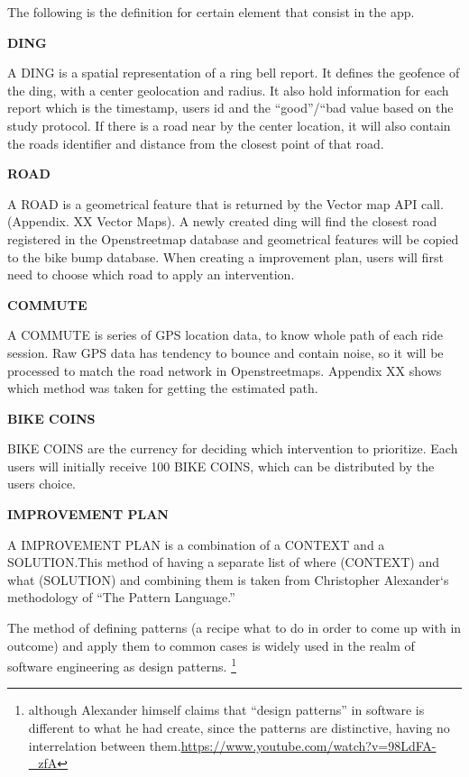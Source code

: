 The following is the definition for certain element that consist in the app.

\textbf{DING}

A DING is a spatial representation of a ring bell report. It defines the
geofence of the ding, with a center geolocation and radius. It also hold
information for each report which is the timestamp, users id and the
``good''/``bad value based on the study protocol. If there is a road near by the center location, it will also contain the roads identifier and distance from the closest point of that road.

\textbf{ROAD}

A ROAD is a geometrical feature that is returned by the Vector map API call. (Appendix. XX Vector Maps). A newly created ding will find the closest road registered in the Openstreetmap database and geometrical features will be copied to the bike bump database. When creating a improvement plan, users will first need to choose which road to apply an intervention.

\textbf{COMMUTE}

A COMMUTE is series of GPS location data, to know whole path of each ride session. Raw GPS data has tendency to bounce and contain noise, so it will be processed to match the road network in Openstreetmaps. Appendix XX shows which method was taken for getting the estimated path.

\textbf{BIKE COINS}

BIKE COINS are the currency for deciding which intervention to
prioritize. Each users will initially receive 100 BIKE COINS, which can be
distributed by the users choice.

\textbf{IMPROVEMENT PLAN}

A IMPROVEMENT PLAN is a combination of a CONTEXT and a SOLUTION.This
method of having a separate list of where (CONTEXT) and what (SOLUTION) and
combining them is taken from Christopher Alexander`s methodology of ``The
Pattern Language.''
\cite{alexander1977pattern}

The method of defining patterns (a recipe what to do in order to come up
with in outcome) and apply them to common cases is widely used in the realm
of software engineering as design patterns.
\footnote{although Alexander himself claims that ``design patterns'' in
  software is different to what he had create, since the patterns are distinctive, having no
interrelation between them.\url{https://www.youtube.com/watch?v=98LdFA-_zfA}}

